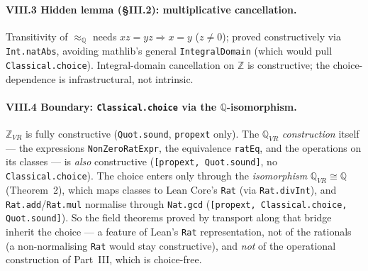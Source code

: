 \documentclass[11pt]{article}
\theoremstyle{definition}
\newcommand{\Z}{\mathbb{Z}}
\newcommand{\Q}{\mathbb{Q}}
\begin{document}
\paragraph{VIII.3 Hidden lemma (\S III.2): multiplicative cancellation.} Transitivity of $\approx_{\Q}$
needs $xz=yz\Rightarrow x=y$ ($z\neq 0$); proved constructively via \texttt{Int.natAbs}, avoiding
mathlib's general \texttt{IntegralDomain} (which would pull \texttt{Classical.choice}). Integral-domain
cancellation on $\Z$ is constructive; the choice-dependence is infrastructural, not intrinsic.

\paragraph{VIII.4 Boundary: \texttt{Classical.choice} via the $\Q$-isomorphism.} $\Z_{VR}$ is fully
constructive (\texttt{Quot.sound}, \texttt{propext} only). The $\Q_{VR}$ \emph{construction} itself ---
the expressions \texttt{NonZeroRatExpr}, the equivalence \texttt{ratEq}, and the operations on its
classes --- is \emph{also} constructive (\texttt{[propext, Quot.sound]}, no \texttt{Classical.choice}).
The choice enters only through the \emph{isomorphism} $\Q_{VR}\cong\Q$ (Theorem~2), which maps classes
to Lean Core's \texttt{Rat} (via \texttt{Rat.divInt}), and \texttt{Rat.add}/\texttt{Rat.mul} normalise
through \texttt{Nat.gcd} (\texttt{[propext, Classical.choice, Quot.sound]}). So the field theorems proved
by transport along that bridge inherit the choice --- a feature of Lean's \texttt{Rat} representation,
not of the rationals (a non-normalising \texttt{Rat} would stay constructive), and \emph{not} of the
operational construction of Part~III, which is choice-free.
\end{document}
